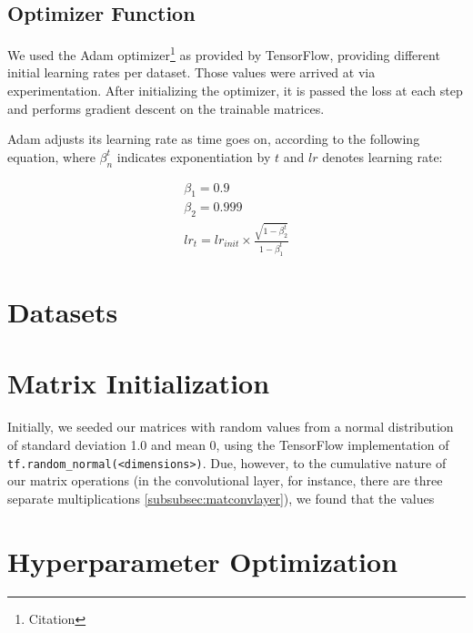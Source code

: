 \subsection{Optimizer Function}
We used the Adam optimizer\footnote{Citation} as provided by TensorFlow, 
providing different initial learning rates per dataset. Those values were 
arrived at via experimentation. After initializing the optimizer, it is passed 
the loss at each step and performs gradient descent on the trainable matrices.

Adam adjusts its learning rate as time goes on, according to the following 
equation, where $\beta_n^t$ indicates exponentiation by $t$ and $lr$ denotes 
learning rate:
\begin{figure}[h]
	\begin{minipage}[b]{.38\textwidth}
		\centering
		\begin{gather}
			\nonumber
			\beta_1 = 0.9\\
			\nonumber
			\beta_2 = 0.999\\
			\nonumber
			lr_t = lr_{init} \times \frac{\sqrt{1-\beta_2^t}}{1-\beta_1^t}
		\end{gather}
	\end{minipage}
	\hfill
	\begin{minipage}{.6\textwidth}
		\centering
	\end{minipage}
\end{figure}

\section{Datasets}


\section{Matrix Initialization}
Initially, we seeded our matrices with random values from a normal distribution 
of standard deviation 1.0 and mean 0, using the TensorFlow implementation of 
\texttt{tf.random\_normal(<dimensions>)}. Due, however, to the cumulative nature 
of our matrix operations (in the convolutional layer, for instance, there are 
three separate multiplications \ref{subsubsec:matconvlayer}), we found that the 
values 

\section{Hyperparameter Optimization}
